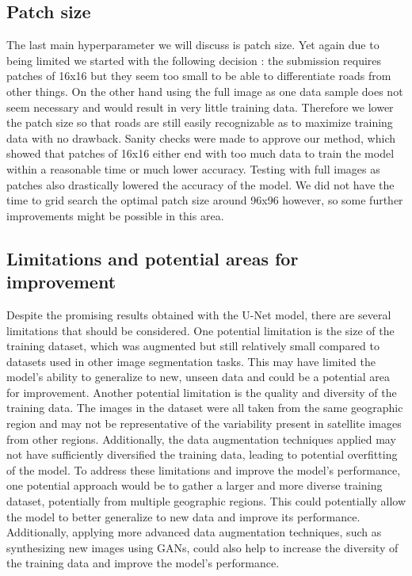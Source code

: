 \documentclass[10pt,conference,compsocconf]{IEEEtran}
\begin{document}
\subsection{Patch size}
The last main hyperparameter we will discuss is patch size. Yet again due to being limited we started with the following decision : the submission requires patches of 16x16 but they seem too small to be able to differentiate roads from other things. On the other hand using the full image as one data sample does not seem necessary and would result in very little training data. Therefore we lower the patch size so that roads are still easily recognizable as to maximize training data with no drawback.
\newline
Sanity checks were made to approve our method, which showed that patches of 16x16 either end with too much data to train the model within a reasonable time or much lower accuracy. Testing with full images as patches also drastically lowered the accuracy of the model. We did not have the time to grid search the optimal patch size around 96x96 however, so some further improvements might be possible in this area.
\subsection{Limitations and potential areas for improvement}
Despite the promising results obtained with the U-Net model, there are several limitations that should be considered. One potential limitation is the size of the training dataset, which was augmented but still relatively small compared to datasets used in other image segmentation tasks. This may have limited the model's ability to generalize to new, unseen data and could be a potential area for improvement.
\newline
Another potential limitation is the quality and diversity of the training data. The images in the dataset were all taken from the same geographic region and may not be representative of the variability present in satellite images from other regions. Additionally, the data augmentation techniques applied may not have sufficiently diversified the training data, leading to potential overfitting of the model.
\newline
To address these limitations and improve the model's performance, one potential approach would be to gather a larger and more diverse training dataset, potentially from multiple geographic regions. This could potentially allow the model to better generalize to new data and improve its performance. Additionally, applying more advanced data augmentation techniques, such as synthesizing new images using GANs, could also help to increase the diversity of the training data and improve the model's performance.
\end{document}

